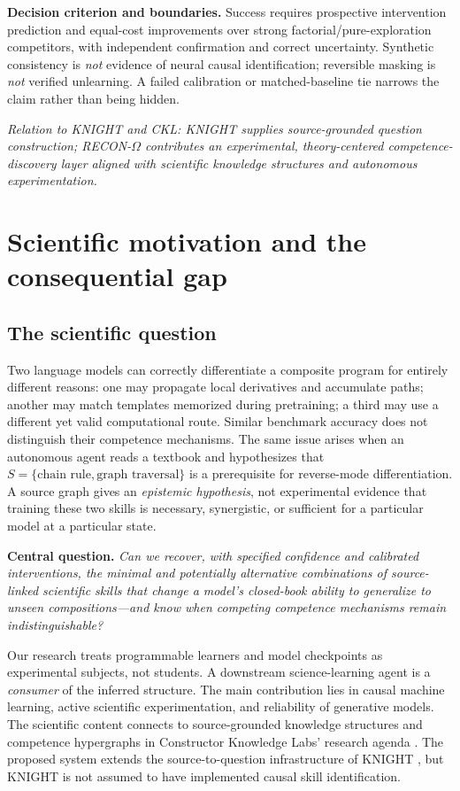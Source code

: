 \documentclass[11pt,a4paper]{article}
\theoremstyle{definition}\newtheorem{definition}[theorem]{Definition}
\theoremstyle{remark}\newtheorem{remark}[theorem]{Remark}
\begin{document}
\textbf{Decision criterion and boundaries.} Success requires prospective intervention prediction and equal-cost improvements over strong factorial/pure-exploration competitors, with independent confirmation and correct uncertainty. Synthetic consistency is \emph{not} evidence of neural causal identification; reversible masking is \emph{not} verified unlearning. A failed calibration or matched-baseline tie narrows the claim rather than being hidden.

\vspace{1mm}\textit{\small Relation to KNIGHT and CKL: KNIGHT supplies source-grounded question construction; RECON-$\Omega$ contributes an experimental, theory-centered competence-discovery layer aligned with scientific knowledge structures and autonomous experimentation.}
\endgroup
\clearpage
\tableofcontents
\clearpage
\section{Scientific motivation and the consequential gap}\label{sec:intro}
\subsection{The scientific question}
Two language models can correctly differentiate a composite program for entirely different reasons: one may propagate local derivatives and accumulate paths; another may match templates memorized during pretraining; a third may use a different yet valid computational route. Similar benchmark accuracy does not distinguish their competence mechanisms. The same issue arises when an autonomous agent reads a textbook and hypothesizes that $S=\{\text{chain rule},\text{graph traversal}\}$ is a prerequisite for reverse-mode differentiation. A source graph gives an \emph{epistemic hypothesis}, not experimental evidence that training these two skills is necessary, synergistic, or sufficient for a particular model at a particular state.

\textbf{Central question.} \emph{Can we recover, with specified confidence and calibrated interventions, the minimal and potentially alternative combinations of source-linked scientific skills that change a model's closed-book ability to generalize to unseen compositions---and know when competing competence mechanisms remain indistinguishable?}

Our research treats programmable learners and model checkpoints as experimental subjects, not students. A downstream science-learning agent is a \emph{consumer} of the inferred structure. The main contribution lies in causal machine learning, active scientific experimentation, and reliability of generative models. The scientific content connects to source-grounded knowledge structures and competence hypergraphs in Constructor Knowledge Labs' research agenda \citep{constructor}. The proposed system extends the source-to-question infrastructure of KNIGHT \citep{knight}, but KNIGHT is not assumed to have implemented causal skill identification.
\end{document}
